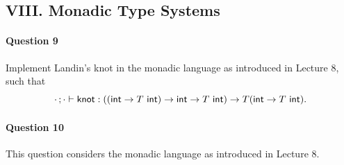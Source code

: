 \documentclass[11pt,a4paper,twoside]{article}
\begin{document}
\subsection*{VIII. Monadic Type Systems}

\paragraph{Question 9} Implement Landin's knot in the monadic
language as introduced in Lecture 8,
such that
\[
  \cdot\, ; \cdot \vdash \mathsf{knot} :
  ((\mathsf{int} \to T\ \mathsf{int}) \to \mathsf{int} \to
  T\ \mathsf{int}) \to T(\mathsf{int} \to T\ \mathsf{int}).
\]

\paragraph{Question 10} This question considers the monadic language
as introduced in Lecture 8.
\end{document}
